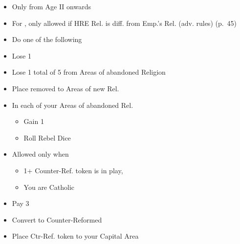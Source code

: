 \documentclass[10pt]{article}
\begin{document}
\begin{itemize}
	\item Only from Age II onwards
	\item For , only allowed if HRE Rel. is diff. from Emp.'s Rel. (adv. rules) (p.~45)
	\item Do one of the following
\end{itemize}
\begin{itemize}
	\item Lose   1\stability
	\item Lose 1 \marriage {} total of 5 \influence from Areas of abandoned Religion
	\item Place removed \influence to Areas of new Rel.
	\item In each of your Areas of abandoned Rel.
	\begin{itemize}
		\item Gain 1 \unrest
		\item Roll Rebel Dice
	\end{itemize}
\end{itemize}
\begin{itemize}
	\item Allowed only when
	\begin{itemize}
		\item 1+ Counter-Ref. token is in play, 
		\item You are Catholic
	\end{itemize}
	\item Pay 3\adminpower
	\item Convert to Counter-Reformed
	\item Place Ctr-Ref. token to your Capital Area
\end{itemize}
\end{document}
